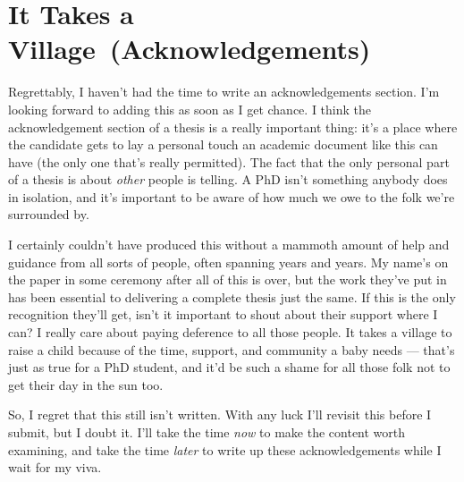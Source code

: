 \chapter*{It Takes a Village~\normalsize(Acknowledgements)}

Regrettably, I haven't had the time to write an acknowledgements section. I'm
looking forward to adding this as soon as I get chance. I think the
acknowledgement section of a thesis is a really important thing: it's a place
where the candidate gets to lay a personal touch an academic document like this
can have (the only one that's really permitted). The fact that the only personal
part of a thesis is about \emph{other} people is telling. A PhD isn't something
anybody does in isolation, and it's important to be aware of how much we owe to
the folk we're surrounded by.

I certainly couldn't have produced this without a mammoth amount of help and
guidance from all sorts of people, often spanning years and years. My name's on
the paper in some ceremony after all of this is over, but the work they've put
in has been essential to delivering a complete thesis just the same. If this is
the only recognition they'll get, isn't it important to shout about their
support where I can? I really care about paying deference to all those people.
It takes a village to raise a child because of the time, support, and community
a baby needs --- that's just as true for a PhD student, and it'd be such a shame
for all those folk not to get their day in the sun too.

So, I regret that this still isn't written. With any luck I'll revisit this
before I submit, but I doubt it. I'll take the time \emph{now} to make the
content worth examining, and take the time \emph{later} to write up these
acknowledgements while I wait for my viva.
